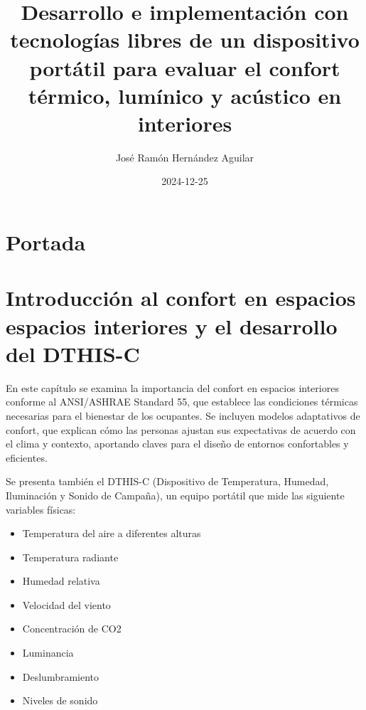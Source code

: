\documentclass[
  letterpaper,
]{scrbook}
\title{Desarrollo e implementación con tecnologías libres de un
dispositivo portátil para evaluar el confort térmico, lumínico y
acústico en interiores}
\author{José Ramón Hernández Aguilar}
\date{2024-12-25}
\providecommand{\tightlist}{%
  \setlength{\itemsep}{0pt}\setlength{\parskip}{0pt}}\usepackage{longtable,booktabs,array}
\renewcommand*\contentsname{Tabla de contenidos}
\newcommand\contentsname{Tabla de contenidos}
\begin{document}
\frontmatter
\maketitle

\renewcommand*\contentsname{Tabla de contenidos}
{
\setcounter{tocdepth}{2}
\tableofcontents
}

\mainmatter
{}

\chapter*{Portada}\label{portada}



\chapter{Introducción al confort en espacios espacios interiores y el
desarrollo del
DTHIS-C}\label{introducciuxf3n-al-confort-en-espacios-espacios-interiores-y-el-desarrollo-del-dthis-c}

En este capítulo se examina la importancia del confort en espacios
interiores conforme al ANSI/ASHRAE Standard 55, que establece las
condiciones térmicas necesarias para el bienestar de los ocupantes. Se
incluyen modelos adaptativos de confort, que explican cómo las personas
ajustan sus expectativas de acuerdo con el clima y contexto, aportando
claves para el diseño de entornos confortables y eficientes.

Se presenta también el DTHIS-C (Dispositivo de Temperatura, Humedad,
Iluminación y Sonido de Campaña), un equipo portátil que mide las
siguiente variables físicas:

\begin{itemize}
\tightlist
\item
  Temperatura del aire a diferentes alturas
\item
  Temperatura radiante
\item
  Humedad relativa
\item
  Velocidad del viento
\item
  Concentración de CO2
\item
  Luminancia
\item
  Deslumbramiento
\item
  Niveles de sonido
\end{itemize}
\end{document}
